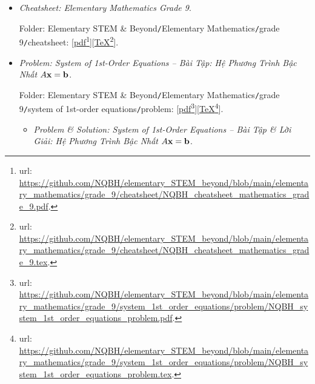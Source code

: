 \documentclass[12pt]{article}
\begin{document}
\begin{itemize}
	\item {\it Cheatsheet: Elementary Mathematics Grade 9}.
	
	Folder: {\sf Elementary STEM \& Beyond{\tt/}Elementary Mathematics{\tt/}grade 9{\tt/}cheatsheet}: [\href{https://github.com/NQBH/elementary_STEM_beyond/blob/main/elementary_mathematics/grade_9/cheatsheet/NQBH_cheatsheet_mathematics_grade_9.pdf}{pdf}\footnote{{\sc url}: \url{https://github.com/NQBH/elementary_STEM_beyond/blob/main/elementary_mathematics/grade_9/cheatsheet/NQBH_cheatsheet_mathematics_grade_9.pdf}.}][\href{https://github.com/NQBH/elementary_STEM_beyond/blob/main/elementary_mathematics/grade_9/cheatsheet/NQBH_cheatsheet_mathematics_grade_9.tex}{\TeX}\footnote{{\sc url}: \url{https://github.com/NQBH/elementary_STEM_beyond/blob/main/elementary_mathematics/grade_9/cheatsheet/NQBH_cheatsheet_mathematics_grade_9.tex}.}].
	\item {\it Problem: System of 1st-Order Equations -- Bài Tập: Hệ Phương Trình Bậc Nhất $A{\bf x} = {\bf b}$}.
	
	Folder: {\sf Elementary STEM \& Beyond{\tt/}Elementary Mathematics{\tt/}grade 9{\tt/}system of 1st-order equations{\tt/}problem}: [\href{https://github.com/NQBH/elementary_STEM_beyond/blob/main/elementary_mathematics/grade_9/system_1st_order_equations/problem/NQBH_system_1st_order_equations_problem.pdf}{pdf}\footnote{{\sc url}: \url{https://github.com/NQBH/elementary_STEM_beyond/blob/main/elementary_mathematics/grade_9/system_1st_order_equations/problem/NQBH_system_1st_order_equations_problem.pdf}.}][\href{https://github.com/NQBH/elementary_STEM_beyond/blob/main/elementary_mathematics/grade_9/system_1st_order_equations/problem/NQBH_system_1st_order_equations_problem.tex}{\TeX}\footnote{{\sc url}: \url{https://github.com/NQBH/elementary_STEM_beyond/blob/main/elementary_mathematics/grade_9/system_1st_order_equations/problem/NQBH_system_1st_order_equations_problem.tex}.}].
	\begin{itemize}
		\item {\it Problem \& Solution: System of 1st-Order Equations -- Bài Tập \& Lời Giải: Hệ Phương Trình Bậc Nhất $A{\bf x} = {\bf b}$}.
		

\end{itemize}
\end{itemize}
\end{document}
